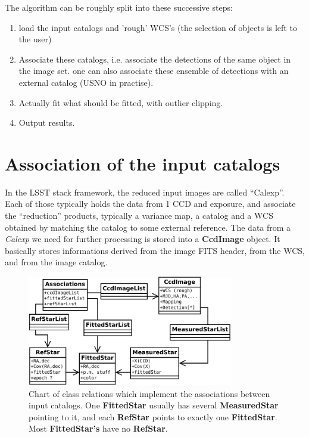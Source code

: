 \documentclass[a4paper,12pt]{scrartcl}
\newcommand{\ClName}[1]{{\bf #1}}
\def\bf{\normalfont\bfseries}
\begin{document}
The algorithm can be roughly split into these successive steps:
\begin{enumerate}
\item load the input catalogs and 'rough' WCS's (the selection
of objects is left to the user)
\item Associate these catalogs, i.e. associate the detections of the
same object in the image set. one can also associate
these ensemble of detections with an external catalog (USNO in practise).
\item Actually fit what should be fitted, with outlier clipping.
\item Output results.
\end{enumerate}


\section{Association of the input catalogs \label{sec:assoc}}
In the LSST stack framework, the reduced input images are called
``Calexp''. Each of those typically holds the data from 1 CCD
and exposure, and associate the ``reduction'' products, typically
a variance map, a catalog and a WCS obtained by matching the catalog to
some external reference. The data from a {\it Calexp} we need for further
processing is stored into a \ClName{CcdImage} object. It basically
stores informations derived from the image FITS header, from the WCS,
and from the image catalog.

\begin{figure}[ht]
\centering
\includegraphics[width=0.8\textwidth]{AssocClasses}
\caption{Chart of class relations which implement the associations
between input catalogs. One \ClName{FittedStar} usually has several
\ClName{MeasuredStar} pointing to it, and each \ClName{RefStar} points 
to exactly one \ClName{FittedStar}. Most \ClName{FittedStar's} have no \ClName{RefStar}.
\label{fig:AssocClasses}
}
\end{figure}
\end{document}
